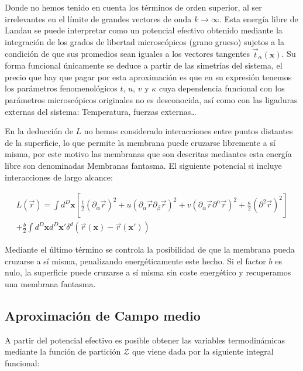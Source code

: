 
Donde no hemos tenido en cuenta los términos de orden superior, al ser
irrelevantes en el límite de grandes vectores de onda $k\rightarrow \infty$. 
Esta energía libre de Landau se puede interpretar como un potencial efectivo
obtenido mediante la integración de los grados de libertad microscópicos
(grano grueso) sujetos a la condición de que sus promedios sean iguales a los
vectores tangentes $\vec{t}_{\alpha}(\mathbf{x})$. Su forma funcional
únicamente se deduce a partir de las simetrías del sistema, el precio que hay
que pagar por esta aproximación es que en su expresión tenemos los parámetros
fenomenológicos $t$, $u$, $v$ y $\kappa$ cuya dependencia funcional con los
parámetros microscópicos originales no es desconocida, así como con las
ligaduras externas del sistema: Temperatura, fuerzas externas\dots  

En la deducción de $L$ no hemos considerado interacciones entre puntos
distantes de la superficie, lo que permite la membrana puede cruzarse
libremente a sí misma, por este motivo las membranas que son descritas
mediantes esta energía libre son denominadas Membranas fantasma. El siguiente
potencial si incluye interacciones de largo alcance:

\begin{multline}
L(\vec{r})=\int d^D\mathbf{x}
\left[
\frac{t}{2}(\partial_{\alpha}\vec{r})^2+
u(\partial_{\alpha}\vec{r}\partial_{\beta}\vec{r})^2+
v(\partial_{\alpha}\vec{r}\partial^{\alpha}\vec{r})^2+
\frac{\kappa}{2}(\partial^2\vec{r})^2
\right]\\
+\frac{b}{2}\int d^D\mathbf{x} d^D\mathbf{x'}
\delta^{d}(\vec{r}(\mathbf{x})-\vec{r}(\mathbf{x'}))
\end{multline}

Mediante el último término se controla la posibilidad de que la membrana pueda
cruzarse a sí misma, penalizando energéticamente este hecho. Si el factor $b$
es nulo, la superficie puede cruzarse a sí misma sin coste energético y
recuperamos una membrana fantasma.

\subsection{Aproximación de Campo medio}

A partir del potencial efectivo es posible obtener las variables
termodinámicas mediante la función de partición $\mathcal{Z}$ que viene dada
por la siguiente integral funcional:

